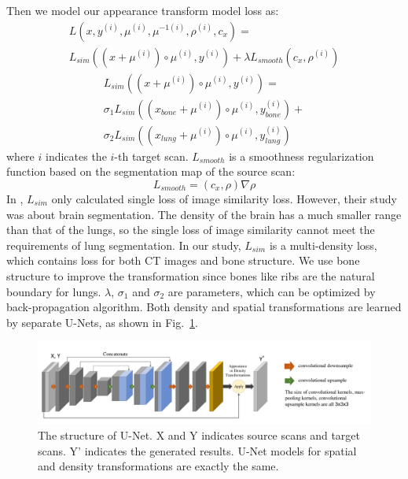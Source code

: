 \documentclass{article}
\def\L{{\cal L}}
\begin{document}
Then we model our appearance transform model loss as:
\begin{align*}
    L(x,y^{(i)},\mu^{(i)},\mu^{-1(i)},\rho^{(i)},c_x)=\qquad\qquad\\L_{sim}((x+\mu^{(i)})\circ\mu^{(i)}, y^{(i)})+\lambda L_{smooth}(c_x,\rho^{(i)})
\end{align*}
\begin{align*}
    L_{sim}((x+\mu^{(i)})\circ\mu^{(i)}, y^{(i)})=\quad\\\sigma_1L_{sim}((x_{bone}+\mu^{(i)})\circ\mu^{(i)}, y_{bone}^{(i)})+\\\sigma_2L_{sim}((x_{lung}+\mu^{(i)})\circ\mu^{(i)}, y_{lung}^{(i)})
\end{align*}
where $i$ indicates the $i$-th target scan. $L_{smooth}$ is a smoothness regularization function based on the segmentation map of the source scan:
\begin{equation}
    L_{smooth}=(c_x,\rho)\nabla\rho
\end{equation}
In \cite{zhao2019data}, $L_{sim}$ only calculated single loss of image similarity loss. However, their study was about brain segmentation. The density of the brain has a much smaller range than that of the lungs, so the single loss of image similarity cannot meet the requirements of lung segmentation. In our study, $L_{sim}$ is a multi-density loss, which contains loss for both CT images and bone structure. We use bone structure to improve the transformation since bones like ribs are the natural boundary for lungs. $\lambda$, $\sigma_1$ and $\sigma_2$ are parameters, which can be optimized by back-propagation algorithm.
Both density and spatial transformations are learned by separate U-Nets, as shown in Fig.~\ref{unet}.
\begin{figure}[htbp]
    \centerline{\includegraphics[width=180mm]{unet.pdf}}
    \vspace{-0cm}
    \caption{The structure of U-Net. X and Y indicates source scans and target scans. Y' indicates the generated results. U-Net models for spatial and density transformations are exactly the same.
    }
    \vspace{-0cm}
    \label{unet}
    \end{figure}
\end{document}
